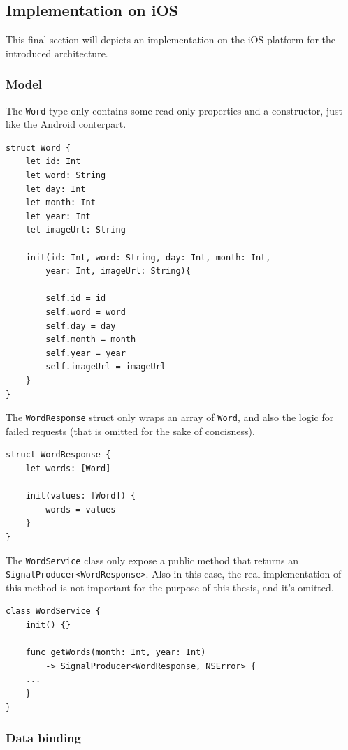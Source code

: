 \subsection{Implementation on iOS}\label{implementation-on-ios}

This final section will depicts an implementation on the iOS platform
for the introduced architecture.

\subsubsection{Model}\label{model}

The \texttt{Word} type only contains some read-only properties and a
constructor, just like the Android conterpart.

\begin{verbatim}
struct Word {
    let id: Int
    let word: String
    let day: Int
    let month: Int
    let year: Int
    let imageUrl: String

    init(id: Int, word: String, day: Int, month: Int,
        year: Int, imageUrl: String){

        self.id = id
        self.word = word
        self.day = day
        self.month = month
        self.year = year
        self.imageUrl = imageUrl
    }
}
\end{verbatim}

The \texttt{WordResponse} struct only wraps an array of \texttt{Word},
and also the logic for failed requests (that is omitted for the sake of
concisness).

\begin{verbatim}
struct WordResponse {
    let words: [Word]

    init(values: [Word]) {
        words = values
    }
}
\end{verbatim}

The \texttt{WordService} class only expose a public method that returns
an \texttt{SignalProducer\textless{}WordResponse\textgreater{}}. Also in
this case, the real implementation of this method is not important for
the purpose of this thesis, and it's omitted.

\begin{verbatim}
class WordService {
    init() {}

    func getWords(month: Int, year: Int)
        -> SignalProducer<WordResponse, NSError> {
    ...
    }
}
\end{verbatim}

\subsubsection{Data binding}\label{data-binding}

